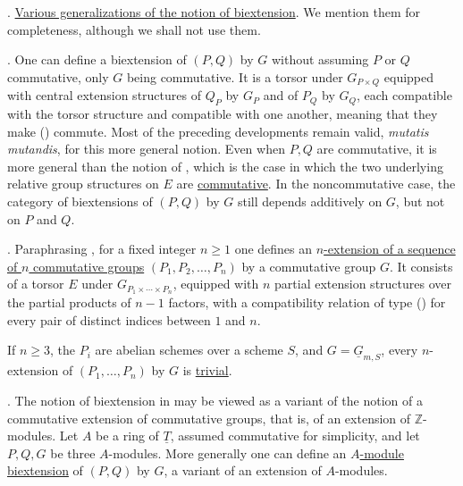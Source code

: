 
. \underline{Various generalizations of the notion of
biextension}. We mention them for completeness, although we shall not
use them.

. One can define a biextension of $(P,Q)$ by $G$ without
assuming $P$ or $Q$ commutative, only $G$ being commutative. It is a
torsor under $G_{P\times Q}$ equipped with central extension
structures of $Q_P$ by $G_P$ and of $P_Q$ by $G_Q$, each compatible
with the torsor structure and compatible with one another, meaning
that they make () commute. Most of the preceding developments
remain valid, \emph{mutatis mutandis}, for this more general notion.
Even when $P,Q$ are commutative, it is more general than the notion of
, which is the case in which the two underlying relative group
structures on $E$ are \underline{commutative}. In the noncommutative
case, the category of biextensions of $(P,Q)$ by $G$ still depends
additively on $G$, but not on $P$ and $Q$.

. Paraphrasing , for a fixed integer $n\geq1$ one defines an
\underline{$n$-extension of a sequence of $n$ commutative groups}
$(P_1,P_2,\ldots,P_n)$ by a commutative group $G$. It consists of a
torsor $E$ under $G_{P_1\times\cdots\times P_n}$, equipped with $n$
partial extension structures over the partial products of $n-1$
factors, with a compatibility relation of type () for every pair
of distinct indices between $1$ and $n$.

If $n\geq3$, the $P_i$ are abelian schemes over a scheme $S$, and
$G=\underline G_{m,S}$, every $n$-extension of
$(P_1,\ldots,P_n)$ by $G$ is \underline{trivial}.

. The notion of biextension in  may be viewed as a variant of
the notion of a commutative extension of commutative groups, that is,
of an extension of $\mathbb Z$-modules. Let $A$ be a ring of
$\underline T$, assumed commutative for simplicity, and let $P,Q,G$
be three $A$-modules. More generally one can define an
\underline{$A$-module biextension} of $(P,Q)$ by $G$, a variant of an
extension of $A$-modules.

